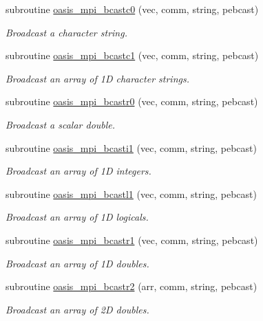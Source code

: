 \begin{DoxyCompactItemize}
subroutine \hyperlink{namespacemod__oasis__mpi_a6d10e1673748a91dc7ec955ef16d771a}{oasis\+\_\+mpi\+\_\+bcastc0} (vec, comm, string, pebcast)
\begin{DoxyCompactList}\small\item\em Broadcast a character string. \end{DoxyCompactList}\item 
subroutine \hyperlink{namespacemod__oasis__mpi_a99b3a1ab4c7617b5bc83d3c6360aaef3}{oasis\+\_\+mpi\+\_\+bcastc1} (vec, comm, string, pebcast)
\begin{DoxyCompactList}\small\item\em Broadcast an array of 1D character strings. \end{DoxyCompactList}\item 
subroutine \hyperlink{namespacemod__oasis__mpi_a3b21bebef1b56b31bd6d07e83d7a59a6}{oasis\+\_\+mpi\+\_\+bcastr0} (vec, comm, string, pebcast)
\begin{DoxyCompactList}\small\item\em Broadcast a scalar double. \end{DoxyCompactList}\item 
subroutine \hyperlink{namespacemod__oasis__mpi_a6f9140637f29d3939dc9c53930101e2e}{oasis\+\_\+mpi\+\_\+bcasti1} (vec, comm, string, pebcast)
\begin{DoxyCompactList}\small\item\em Broadcast an array of 1D integers. \end{DoxyCompactList}\item 
subroutine \hyperlink{namespacemod__oasis__mpi_a8b03787549fba5faff499c946d521db0}{oasis\+\_\+mpi\+\_\+bcastl1} (vec, comm, string, pebcast)
\begin{DoxyCompactList}\small\item\em Broadcast an array of 1D logicals. \end{DoxyCompactList}\item 
subroutine \hyperlink{namespacemod__oasis__mpi_a6f12178b027ff30cb87f9f8313b459d5}{oasis\+\_\+mpi\+\_\+bcastr1} (vec, comm, string, pebcast)
\begin{DoxyCompactList}\small\item\em Broadcast an array of 1D doubles. \end{DoxyCompactList}\item 
subroutine \hyperlink{namespacemod__oasis__mpi_ab14018fe59cd737067e4f4202a3eeb39}{oasis\+\_\+mpi\+\_\+bcastr2} (arr, comm, string, pebcast)
\begin{DoxyCompactList}\small\item\em Broadcast an array of 2D doubles. \end{DoxyCompactList}\item 

\end{DoxyCompactItemize}
